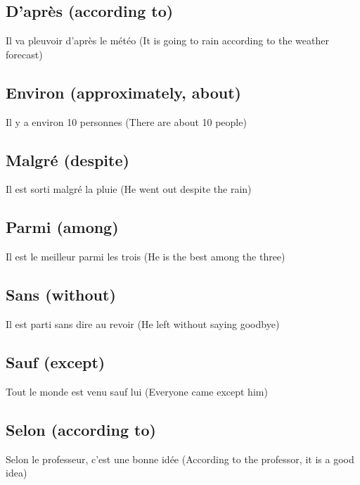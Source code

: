 \documentclass{book}
\begin{document}
        \subsection{D'après (according to)}
            \begin{center}
                Il va pleuvoir d'après le météo (It is going to rain according to the weather forecast)
            \end{center}
        \subsection{Environ (approximately, about)}
            \begin{center}
                Il y a environ 10 personnes (There are about 10 people)
            \end{center}
        \subsection{Malgré (despite)}
            \begin{center}
                Il est sorti malgré la pluie (He went out despite the rain)
            \end{center}
        \subsection{Parmi (among)}
            \begin{center}
                Il est le meilleur parmi les trois (He is the best among the three)
            \end{center}
        \subsection{Sans (without)}
            \begin{center}
                Il est parti sans dire au revoir (He left without saying goodbye)
            \end{center}
        \subsection{Sauf (except)}
            \begin{center}
                Tout le monde est venu sauf lui (Everyone came except him)
            \end{center}
        \subsection{Selon (according to)}
            \begin{center}
                Selon le professeur, c'est une bonne idée (According to the professor, it is a good idea)
            \end{center}
\end{document}
